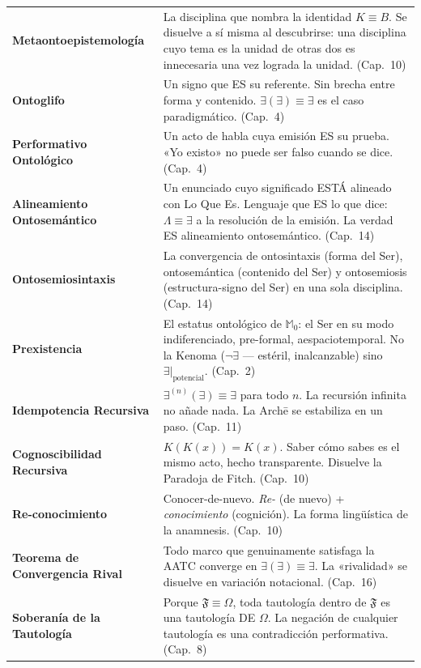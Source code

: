 \documentclass[10pt, openany, oneside]{book}
\begin{document}
{\begin{tabular}{@{} l @{\hspace{0.6em}} p{} @{}}
\textbf{Metaontoepistemología} & La disciplina que nombra la identidad $K \equiv B$. Se disuelve a sí misma al descubrirse: una disciplina cuyo tema es la unidad de otras dos es innecesaria una vez lograda la unidad. (Cap.\ 10) \\[0.3em]
\textbf{Ontoglifo} & Un signo que ES su referente. Sin brecha entre forma y contenido. $\exists(\exists) \equiv \exists$ es el caso paradigmático. (Cap.\ 4) \\[0.3em]
\textbf{Performativo Ontológico} & Un acto de habla cuya emisión ES su prueba. «Yo existo» no puede ser falso cuando se dice. (Cap.\ 4) \\[0.3em]
\textbf{Alineamiento Ontosemántico} & Un enunciado cuyo significado ESTÁ alineado con Lo Que Es. Lenguaje que ES lo que dice: $\Lambda \equiv \exists$ a la resolución de la emisión. La verdad ES alineamiento ontosemántico. (Cap.\ 14) \\[0.3em]
\textbf{Ontosemiosintaxis} & La convergencia de ontosintaxis (forma del Ser), ontosemántica (contenido del Ser) y ontosemiosis (estructura-signo del Ser) en una sola disciplina. (Cap.\ 14) \\[0.3em]
\textbf{Prexistencia} & El estatus ontológico de $\mathbb{M}_0$: el Ser en su modo indiferenciado, pre-formal, aespaciotemporal. No la Kenoma ($\neg\exists$ --- estéril, inalcanzable) sino $\exists|_{\text{potencial}}$. (Cap.\ 2) \\[0.3em]
\textbf{Idempotencia Recursiva} & $\exists^{(n)}(\exists) \equiv \exists$ para todo $n$. La recursión infinita no añade nada. La Arch\={e} se estabiliza en un paso. (Cap.\ 11) \\[0.3em]
\textbf{Cognoscibilidad Recursiva} & $K(K(x)) = K(x)$. Saber cómo sabes es el mismo acto, hecho transparente. Disuelve la Paradoja de Fitch. (Cap.\ 10) \\[0.3em]
\textbf{Re-conocimiento} & Conocer-de-nuevo. \textit{Re-} (de nuevo) + \textit{conocimiento} (cognición). La forma lingüística de la anamnesis. (Cap.\ 10) \\[0.3em]
\textbf{Teorema de Convergencia Rival} & Todo marco que genuinamente satisfaga la AATC converge en $\exists(\exists) \equiv \exists$. La «rivalidad» se disuelve en variación notacional. (Cap.\ 16) \\[0.3em]
\textbf{Soberanía de la Tautología} & Porque $\mathfrak{F} \equiv \Omega$, toda tautología dentro de $\mathfrak{F}$ es una tautología DE $\Omega$. La negación de cualquier tautología es una contradicción performativa. (Cap.\ 8) \\[0.3em]

\end{tabular}}
\end{document}
